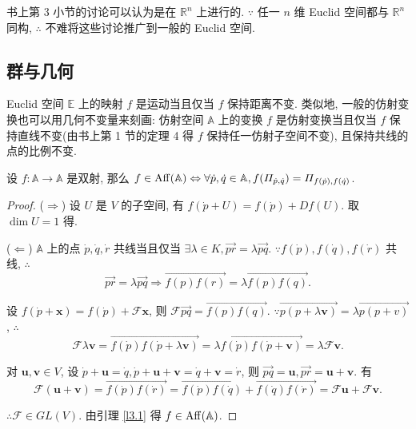 \documentclass[color=black,device=normal,lang=cn,mode=geye]{elegantnote}
\begin{document}
书上第 3 小节的讨论可以认为是在 $\mathbb{R}^n$ 上进行的. $\because$ 任一 $n$ 维 Euclid 空间都与 $\mathbb{R}^n$ 同构, $\therefore$ 不难将这些讨论推广到一般的 Euclid 空间.
\subsection{群与几何}
Euclid 空间 $\mathbb{E}$ 上的映射 $f$ 是运动当且仅当 $f$ 保持距离不变. 类似地, 一般的仿射变换也可以用几何不变量来刻画: 仿射空间 $\mathbb{A}$ 上的变换 $f$ 是仿射变换当且仅当 $f$ 保持直线不变(由书上第 1 节的定理 4 得 $f$ 保持任一仿射子空间不变), 且保持共线的点的比例不变.
\begin{theorem}[书上的定理 9]
    设 $f:\mathbb{A}\to\mathbb{A}$ 是双射, 那么 $f\in\operatorname{Aff} (\mathbb{A})\Leftrightarrow\forall\dot{p},\dot{q}\in\mathbb{A},f(\varPi_{\dot{p},\dot{q}})=\varPi_{f(\dot{p}),f(\dot{q})}$.
\end{theorem}
\begin{proof}
    ($\Rightarrow$) 设 $U$ 是 $V$ 的子空间, 有 $f(\dot{p}+U)=f(\dot{p})+Df(U)$. 取 $\dim U=1$ 得.

    ($\Leftarrow$) $\mathbb{A}$ 上的点 $\dot{p},\dot{q},\dot{r}$ 共线当且仅当 $\exists\lambda\in K,\overrightarrow{pr}=\lambda\overrightarrow{pq}$. $\because f(\dot{p}),f(\dot{q}),f(\dot{r})$ 共线, $\therefore$
    \[\overrightarrow{pr}=\lambda\overrightarrow{pq}\Rightarrow\overrightarrow{f(p)f(r)}=\lambda\overrightarrow{f(p)f(q)}.\]

    设 $f(\dot{p}+\boldsymbol{x})=f(\dot{p})+\mathcal{F}\boldsymbol{x}$, 则 $\mathcal{F}\overrightarrow{pq}=\overrightarrow{f(p)f(q)}$. $\because\overrightarrow{p(p+\lambda\boldsymbol{v})}=\lambda\overrightarrow{p(p+v)}$, $\therefore$
    \[\mathcal{F}\lambda\boldsymbol{v}=\overrightarrow{f(\dot{p})f(\dot{p}+\lambda\boldsymbol{v})}=\lambda\overrightarrow{f(\dot{p})f(\dot{p}+\boldsymbol{v})}=\lambda\mathcal{F}\boldsymbol{v}.\]

    对 $\boldsymbol{u},\boldsymbol{v}\in V$, 设 $\dot{p}+\boldsymbol{u}=\dot{q},\dot{p}+\boldsymbol{u}+\boldsymbol{v}=\dot{q}+\boldsymbol{v}=\dot{r}$, 则 $\overrightarrow{pq}=\boldsymbol{u},\overrightarrow{pr}=\boldsymbol{u}+\boldsymbol{v}$. 有
    \[\mathcal{F}(\boldsymbol{u}+\boldsymbol{v})=\overrightarrow{f(\dot{p})f(\dot{r})}=\overrightarrow{f(\dot{p})f(\dot{q})}+\overrightarrow{f(\dot{q})f(\dot{r})}=\mathcal{F}\boldsymbol{u}+\mathcal{F}\boldsymbol{v}.\]

    $\therefore\mathcal{F}\in GL (V)$. 由引理 \ref{l3.1} 得 $f\in\operatorname{Aff} (\mathbb{A})$.
\end{proof}
\end{document}
